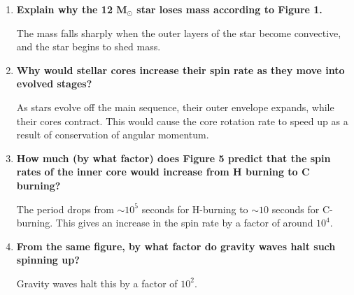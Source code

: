 \documentclass[11pt]{article}
\begin{document}
\begin{enumerate}
    \item \textbf{Explain why the 12 M$_{\odot}$ star loses mass according to
        Figure 1.}

        The mass falls sharply when the outer layers of the star
        become convective, and the star begins to shed mass.

    \item \textbf{Why would stellar cores increase their spin rate as
        they move into evolved stages?}

        As stars evolve off the main sequence, their outer envelope
        expands, while their cores contract.
        This would cause the core rotation rate to speed up as a result
        of conservation of angular momentum.

    \item \textbf{How much (by what factor) does Figure 5 predict
        that the spin rates of the inner core would increase from
        H burning to C burning?}

        The period drops from $\sim 10^{5}$ seconds for H-burning
        to $\sim 10$ seconds for C-burning. This gives an increase
        in the spin rate by a factor of around $10^{4}$.

    \item \textbf{From the same figure, by what factor do gravity
        waves halt such spinning up?}

        Gravity waves halt this by a factor of $10^{2}$.

\end{enumerate}
\end{document}
